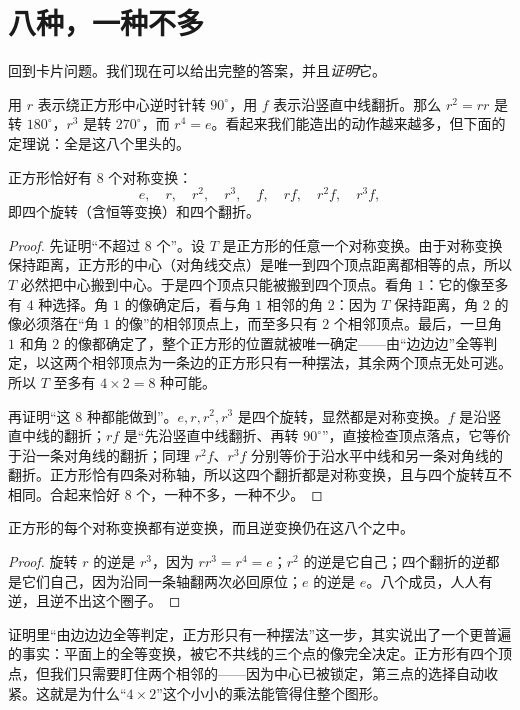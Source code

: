 \section{八种，一种不多}

回到卡片问题。我们现在可以给出完整的答案，并且\emph{证明}它。

用 $r$ 表示绕正方形中心逆时针转 $90^\circ$，用 $f$ 表示沿竖直中线翻折。那么 $r^2=rr$ 是转 $180^\circ$，$r^3$ 是转 $270^\circ$，而 $r^4=e$。看起来我们能造出的动作越来越多，但下面的定理说：全是这八个里头的。

\begin{dingli}[正方形的对称变换]
正方形恰好有 $8$ 个对称变换：
\[
e,\quad r,\quad r^2,\quad r^3,\quad f,\quad rf,\quad r^2f,\quad r^3f,
\]
即四个旋转（含恒等变换）和四个翻折。
\end{dingli}

\begin{proof}
先证明“不超过 $8$ 个”。设 $T$ 是正方形的任意一个对称变换。由于对称变换保持距离，正方形的中心（对角线交点）是唯一到四个顶点距离都相等的点，所以 $T$ 必然把中心搬到中心。于是四个顶点只能被搬到四个顶点。看角 $1$：它的像至多有 $4$ 种选择。角 $1$ 的像确定后，看与角 $1$ 相邻的角 $2$：因为 $T$ 保持距离，角 $2$ 的像必须落在“角 $1$ 的像”的相邻顶点上，而至多只有 $2$ 个相邻顶点。最后，一旦角 $1$ 和角 $2$ 的像都确定了，整个正方形的位置就被唯一确定——由“边边边”全等判定，以这两个相邻顶点为一条边的正方形只有一种摆法，其余两个顶点无处可逃。所以 $T$ 至多有 $4\times2=8$ 种可能。

再证明“这 $8$ 种都能做到”。$e,r,r^2,r^3$ 是四个旋转，显然都是对称变换。$f$ 是沿竖直中线的翻折；$rf$ 是“先沿竖直中线翻折、再转 $90^\circ$”，直接检查顶点落点，它等价于沿一条对角线的翻折；同理 $r^2f$、$r^3f$ 分别等价于沿水平中线和另一条对角线的翻折。正方形恰有四条对称轴，所以这四个翻折都是对称变换，且与四个旋转互不相同。合起来恰好 $8$ 个，一种不多，一种不少。
\end{proof}

\begin{tuilun}
正方形的每个对称变换都有逆变换，而且逆变换仍在这八个之中。
\end{tuilun}

\begin{proof}
旋转 $r$ 的逆是 $r^3$，因为 $rr^3=r^4=e$；$r^2$ 的逆是它自己；四个翻折的逆都是它们自己，因为沿同一条轴翻两次必回原位；$e$ 的逆是 $e$。八个成员，人人有逆，且逆不出这个圈子。
\end{proof}

\begin{zhu}
证明里“由边边边全等判定，正方形只有一种摆法”这一步，其实说出了一个更普遍的事实：平面上的全等变换，被它不共线的三个点的像完全决定。正方形有四个顶点，但我们只需要盯住两个相邻的——因为中心已被锁定，第三点的选择自动收紧。这就是为什么“$4\times2$”这个小小的乘法能管得住整个图形。
\end{zhu}

